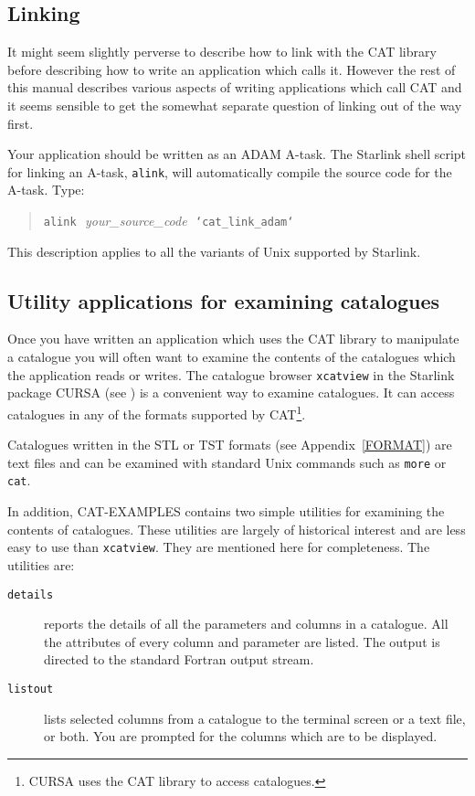 \subsection{\label{LINK}Linking}

It might seem slightly perverse to describe how to link with the CAT
library before describing how to write an application which calls it.
However the rest of this manual describes various aspects of writing
applications which call CAT and it seems sensible to get the somewhat
separate question of linking out of the way first.

Your application should be written as an ADAM A-task.  The Starlink
shell script for linking an A-task, {\tt alink}, will automatically compile
the source code for the A-task. Type:

\begin{verse}
{\tt alink}\,\, {\it  your\_source\_code}\,\,  {\tt `cat\_link\_adam`}
\end{verse}

This description applies to all the variants of Unix supported by
Starlink.

\subsection{\label{UTIL}Utility applications for examining catalogues}

Once you have written an application which uses the CAT library to
manipulate a catalogue you will often want to examine the contents of
the catalogues which the application reads or writes.  The catalogue
browser {\tt xcatview} in the Starlink package CURSA (see
\cite{SUN190}) is a convenient way to examine
catalogues.  It can access catalogues in any of the formats supported
by CAT\footnote{CURSA uses the CAT library to access catalogues.}.

Catalogues written in the STL or TST formats (see Appendix~\ref{FORMAT})
are text files and can be examined with standard Unix commands such
as {\tt more} or {\tt cat}.

In addition, CAT-EXAMPLES contains two simple utilities for examining the
contents of catalogues.  These utilities are largely of historical
interest and are less easy to use than {\tt xcatview}.  They are mentioned
here for completeness.  The utilities are:

\begin{description}

  \item[{\tt details}] reports the details of all the parameters and
   columns in a catalogue. All the attributes of every column and
   parameter are listed. The output is directed to the standard Fortran
   output stream.

  \item[{\tt listout}] lists selected columns from a catalogue to the
   terminal screen or a text file, or both. You are prompted for the
   columns which are to be displayed.

\end{description}

